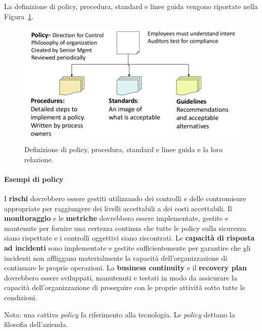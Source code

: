 La definizione di policy, procedura, standard e linee guida vengono
riportate nella Figura~\ref{fig:doc:policy}.


\begin{figure}[h!]
        \begin{center}
                \includegraphics[scale=0.4]{res/img/documentation_policy}
        \end{center}
        \caption{Definizione di policy, procedura, standard e linee
        guida e la loro relazione.}
        \label{fig:doc:policy}
\end{figure}

\paragraph*{Esempi di policy}

I \textbf{rischi} dovrebbero essere gestiti utilizzando dei controlli e delle
contromisure appropriate per raggiungere dei livelli accettabili a dei costi
accettabili. Il \textbf{monitoraggio} e le \textbf{metriche} dovrebbero essere
implementate, gestite e mantenute per fornire una certezza continua che tutte
le policy sulla sicurezza siano rispettate e i controlli oggettivi siano
riscontrati. Le \textbf{capacità di risposta ad incidenti} sono implementate e
gestite sufficientemente per garantire che gli incidenti non affliggano
materialmente la capacità dell'organizzazione di continuare le proprie
operazioni.
La \textbf{business continuity} e il \textbf{recovery plan} dovrebbero essere
sviluppati, manutenuti e testati in modo da assicurare la capacità
dell'organizzazione di proseguire con le proprie attività sotto tutte le
condizioni.


Nota: una cattiva \textit{policy} fa riferimento alla tecnologia. Le
\textit{policy} dettano la filosofia dell'azienda.



